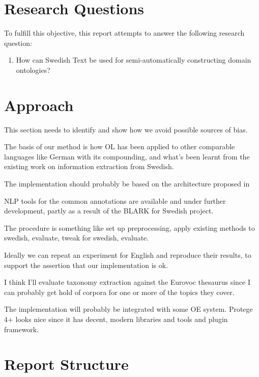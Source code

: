 \documentclass[a4paper]{report}
\begin{document}
\section{Research Questions}

To fulfill this objective, this report attempts to answer the following research question:

\begin{enumerate}
	\item How can Swedish Text be used for semi-automatically constructing domain ontologies?
\end{enumerate}

\section{Approach}

This section needs to identify and show how we avoid possible sources of bias.

The basis of our method is how OL has been applied to other comparable languages like German with its compounding, and what's been learnt from the existing work on information extraction from Swedish.

The implementation should probably be based on the architecture proposed in \cite{Cimiano2009OL}

NLP tools for the common annotations are available and under further development, partly as a result of the BLARK for Swedish project.

The procedure is something like set up preprocessing, apply existing methods to swedish, evaluate, tweak for swedish, evaluate.

Ideally we can repeat an experiment for English and reproduce their results, to support the assertion that our implementation is ok.

I think I'll evaluate taxonomy extraction against the Eurovoc thesaurus since I can probably get hold of corpora for one or more of the topics they cover.

The implementation will probably be integrated with some OE system.
Protege 4+ looks nice since it has decent, modern libraries and tools and plugin framework.



\section{Report Structure}
\end{document}
